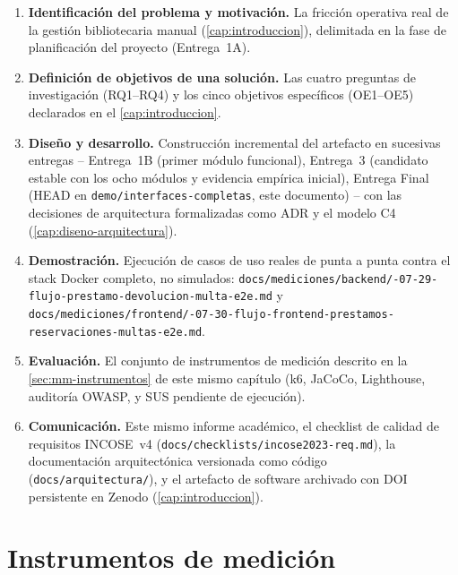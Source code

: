 \begin{enumerate}[leftmargin=1.4cm]
  \item \textbf{Identificación del problema y motivación.} La fricción
    operativa real de la gestión bibliotecaria manual
    (\autoref{cap:introduccion}), delimitada en la fase de planificación
    del proyecto (Entrega~1A).
  \item \textbf{Definición de objetivos de una solución.} Las cuatro
    preguntas de investigación (RQ1--RQ4) y los cinco objetivos
    específicos (OE1--OE5) declarados en el \autoref{cap:introduccion}.
  \item \textbf{Diseño y desarrollo.} Construcción incremental del
    artefacto en sucesivas entregas -- Entrega~1B (primer módulo
    funcional), Entrega~3 (candidato estable con los ocho módulos y
    evidencia empírica inicial), Entrega Final (HEAD en \texttt{demo/interfaces-completas}, este
    documento) -- con las decisiones de arquitectura formalizadas como
    ADR y el modelo C4 (\autoref{cap:diseno-arquitectura}).
  \item \textbf{Demostración.} Ejecución de casos de uso reales de punta
    a punta contra el stack Docker completo, no simulados:
    \texttt{docs/\allowbreak mediciones/\allowbreak backend/-07-29-flujo-prestamo-devolucion-multa-e2e.md}
    y
    \texttt{docs/\allowbreak mediciones/\allowbreak frontend/-07-30-flujo-\allowbreak frontend-\allowbreak prestamos-\allowbreak reservaciones-\allowbreak multas-e2e.md}.
  \item \textbf{Evaluación.} El conjunto de instrumentos de medición
    descrito en la \autoref{sec:mm-instrumentos} de este mismo capítulo
    (k6, JaCoCo, Lighthouse, auditoría OWASP, y SUS pendiente de
    ejecución).
  \item \textbf{Comunicación.} Este mismo informe académico, el checklist
    de calidad de requisitos INCOSE~v4
    (\texttt{docs/checklists/incose2023-req.md}), la documentación
    arquitectónica versionada como código (\texttt{docs/arquitectura/}),
    y el artefacto de software archivado con DOI persistente en Zenodo
    (\autoref{cap:introduccion}).
\end{enumerate}

\section{Instrumentos de medición}
\label{sec:mm-instrumentos}


